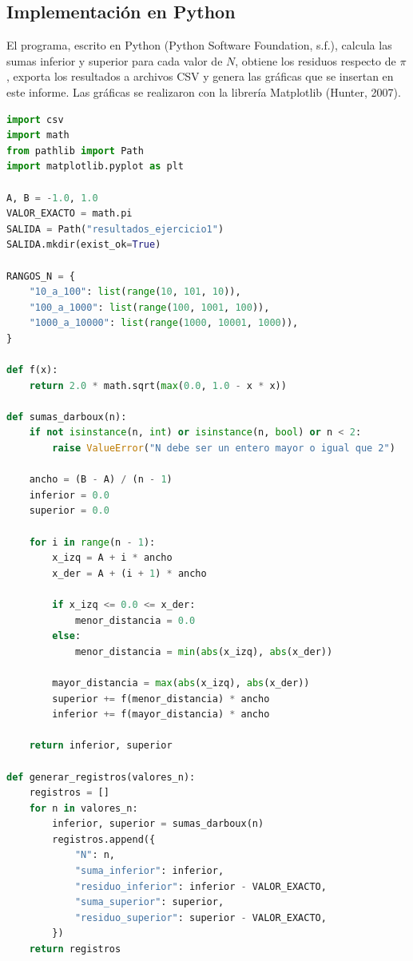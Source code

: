 \subsection{Implementación en Python}

El programa, escrito en Python (Python Software Foundation, s.f.), calcula las sumas inferior y superior para cada valor de \(N\), obtiene los residuos respecto de \(\pi\), exporta los resultados a archivos CSV y genera las gráficas que se insertan en este informe. Las gráficas se realizaron con la librería Matplotlib (Hunter, 2007).

\begin{lstlisting}[language=Python,caption={Código de Python para calcular las sumas y generar tablas y gráficas}]
import csv
import math
from pathlib import Path
import matplotlib.pyplot as plt

A, B = -1.0, 1.0
VALOR_EXACTO = math.pi
SALIDA = Path("resultados_ejercicio1")
SALIDA.mkdir(exist_ok=True)

RANGOS_N = {
    "10_a_100": list(range(10, 101, 10)),
    "100_a_1000": list(range(100, 1001, 100)),
    "1000_a_10000": list(range(1000, 10001, 1000)),
}

def f(x):
    return 2.0 * math.sqrt(max(0.0, 1.0 - x * x))

def sumas_darboux(n):
    if not isinstance(n, int) or isinstance(n, bool) or n < 2:
        raise ValueError("N debe ser un entero mayor o igual que 2")

    ancho = (B - A) / (n - 1)
    inferior = 0.0
    superior = 0.0

    for i in range(n - 1):
        x_izq = A + i * ancho
        x_der = A + (i + 1) * ancho

        if x_izq <= 0.0 <= x_der:
            menor_distancia = 0.0
        else:
            menor_distancia = min(abs(x_izq), abs(x_der))

        mayor_distancia = max(abs(x_izq), abs(x_der))
        superior += f(menor_distancia) * ancho
        inferior += f(mayor_distancia) * ancho

    return inferior, superior

def generar_registros(valores_n):
    registros = []
    for n in valores_n:
        inferior, superior = sumas_darboux(n)
        registros.append({
            "N": n,
            "suma_inferior": inferior,
            "residuo_inferior": inferior - VALOR_EXACTO,
            "suma_superior": superior,
            "residuo_superior": superior - VALOR_EXACTO,
        })
    return registros


\end{lstlisting}
